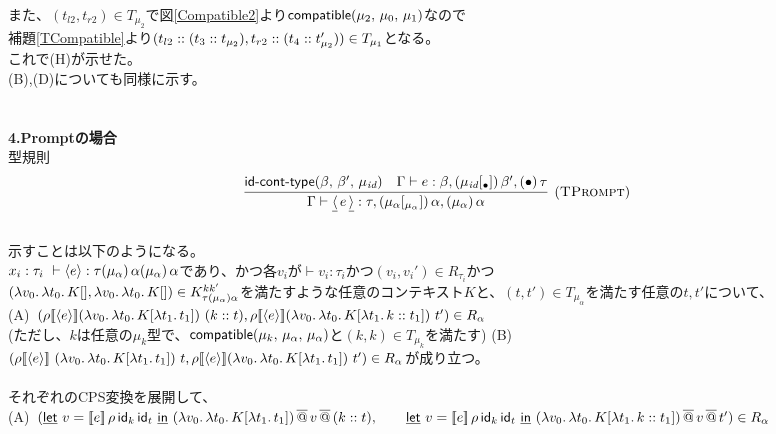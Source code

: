 また、$(t_{l2},t_{r2})\in T_{\mu_2}$で図\ref{Compatible2}より$\textsf{compatible}(\mu_2,\,\mu_0,\,\mu_1)$なので\\
補題\ref{TCompatible}より$(t_{l2}::(t_3::t_{\mu_2}),t_{r2}::(t_4::t_{\mu_2}'))\in T_{\mu_1}$となる。\\
これで(H)が示せた。\\
(B),(D)についても同様に示す。\\
\\
\\
\textbf{4.Promptの場合}\\
型規則
\[
\begin{array}{c}
  \infer[\TPrompt]
      {\JudgeTrail{\Gamma}{\DReset{e}}{\tau}{\TrailsType{\alpha}{\alpha}}
                                            {\TrailType{\alpha}}}
      {\IsIdTrail{\beta}{\beta'}{\MuId}
      &\JudgeTrail{\Gamma}{e}{\beta}
                  {\TsType{\MuId}{\beta'}{\Bullet}}
                  {\TType{\Bullet}{\tau}}}
\end{array}
\]
\\
示すことは以下のようになる。\\
$x_i:\tau_i\ \vdash \langle{e}\rangle:\tau (\mu_{\alpha})\,\alpha (\mu_{\alpha})\,\alpha$であり、かつ各$v_i$が$\vdash v_i:\tau_i$かつ$(v_i,v_i') \in R_{\tau_i}$かつ\\
$(\lambda{v_0}.\,{\lambda{t_0}.\,{K[]}}, \lambda{v_0}.\,{\lambda{t_0}.\,{K[]}})\in  K^{kk'}_{\tau(\mu_{\alpha})\alpha}$を満たすような任意のコンテキスト$K$と、$(t, t') \in T_{\mu_{\alpha}}$を満たす任意の$t, t'$について、\\
(A)\ $(\rho \CPSTh{\Prompt{e}} \LamP{v_0}{\Lam{t_0}{K[\Lam{t_1}{t_1}]}}\ (\Cons{k}{t}), \rho \CPSTh{\Prompt{e}} \LamP{v_0}{\Lam{t_0}{K[\Lam{t_1}{\Cons{k}{t_1}}]}}\ t')\in R_{\alpha}$\\
(ただし、$k$は任意の$\mu_k$型で、$\textsf{compatible}(\mu_k,\,\mu_{\alpha},\,\mu_{\alpha})$と$(k,k)\in T_{\mu_k}$を満たす)
(B)\ $(\rho \CPSTh{\Prompt{e}}\ \LamP{v_0}{\Lam{t_0}{K[\Lam{t_1}{t_1}]}}\ t, \rho \CPSTh{\Prompt{e}} \LamP{v_0}{\Lam{t_0}{K[\Lam{t_1}{t_1}]}}\ t')\in R_{\alpha}$が成り立つ。\\
\\
それぞれのCPS変換を展開して、\\
(A)\ $(\underline{\textsf{let}}\ v=[\![{e}]\!]\,\rho\,\textsf{id}_k\,\textsf{id}_t\ \underline{\textsf{in}}\ {{(\lambda{v_0}.\,{\lambda{t_0}.\,{K[\lambda{t_1}.\,{t_1}]}})}\,\overline{@}\,{v}}\,\overline{@}\,{(k::t)},\\
\qquad   \underline{\textsf{let}}\ v=[\![{e}]\!]\,\rho\,\textsf{id}_k\,\textsf{id}_t\ \underline{\textsf{in}}\ {{(\lambda{v_0}.\,{\lambda{t_0}.\,{K[\lambda{t_1}.\,{k::t_1}]}})}\,\overline{@}\,{v}}\,\overline{@}\,{t'})\in R_{\alpha}$ \\
